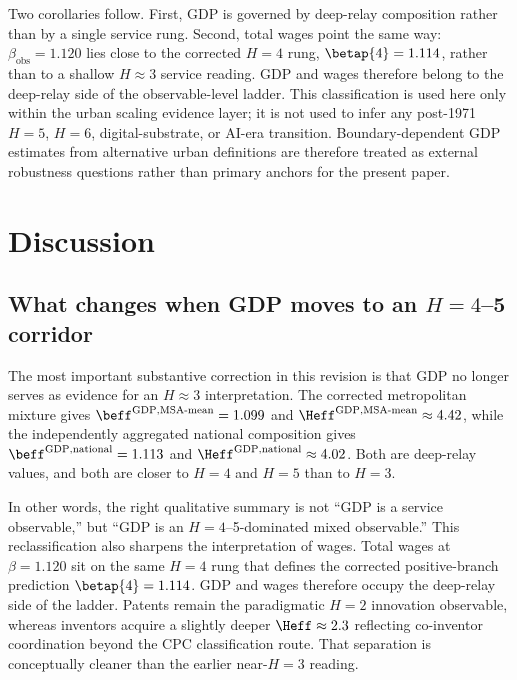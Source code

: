 Two corollaries follow. First, GDP is governed by deep-relay composition rather than by a single service rung. Second, total wages point the same way: \(\beta_{\mathrm{obs}}=1.120\) lies close to the corrected \(H=4\) rung, \(\betap{4}=1.114\), rather than to a shallow \(H\approx 3\) service reading. GDP and wages therefore belong to the deep-relay side of the observable-level ladder. This classification is used here only within the urban scaling evidence layer; it is not used to infer any post-1971 \(H=5\), \(H=6\), digital-substrate, or AI-era transition. Boundary-dependent GDP estimates from alternative urban definitions are therefore treated as external robustness questions rather than primary anchors for the present paper.

\section{Discussion}

\subsection{What changes when GDP moves to an \(H=4\)--5 corridor}

The most important substantive correction in this revision is that GDP no
longer serves as evidence for an \(H\approx 3\) interpretation.
The corrected metropolitan mixture gives
\(\beff^{\mathrm{GDP,MSA\text{-}mean}}=1.099\) and
\(\Heff^{\mathrm{GDP,MSA\text{-}mean}}\approx 4.42\), while the independently
aggregated national composition gives
\(\beff^{\mathrm{GDP,national}}=1.113\) and
\(\Heff^{\mathrm{GDP,national}}\approx 4.02\).
Both are deep-relay values, and both are closer to \(H=4\) and \(H=5\) than to
\(H=3\).

In other words, the right qualitative summary is not ``GDP is a service
observable,'' but ``GDP is an \(H=4\)--5-dominated mixed observable.''
This reclassification also sharpens the interpretation of wages.
Total wages at \(\beta=1.120\) sit on the same \(H=4\) rung that defines the
corrected positive-branch prediction \(\betap{4}=1.114\).
GDP and wages therefore occupy the deep-relay side of the ladder. Patents
remain the paradigmatic \(H=2\) innovation observable, whereas inventors
acquire a slightly deeper \(\Heff\approx 2.3\) reflecting co-inventor
coordination beyond the CPC classification route.
That separation is conceptually cleaner than the earlier near-\(H=3\) reading.


